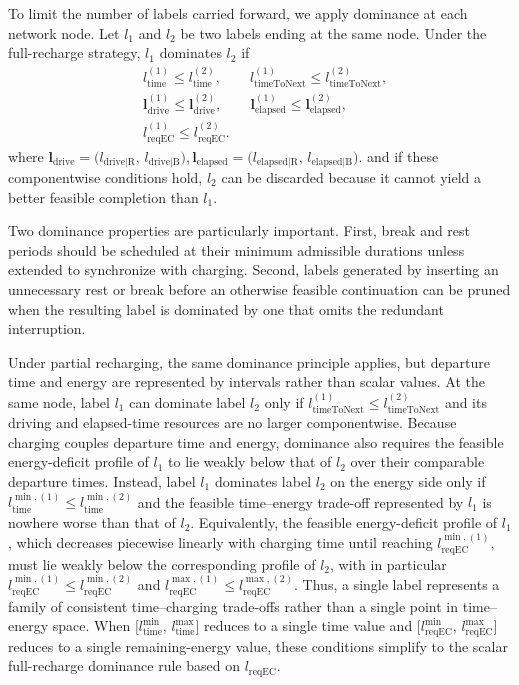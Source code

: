 \documentclass[3p,11pt,authoryear]{elsarticle}  %
\begin{document}
To limit the number of labels carried forward, we apply dominance at each network node. Let \(l_1\) and \(l_2\) be two labels ending at the same node. Under the full-recharge strategy, \(l_1\) dominates \(l_2\) if
\[
\begin{aligned}
&l_{\text{time}}^{(1)} \le l_{\text{time}}^{(2)},\qquad
l_{\text{timeToNext}}^{(1)} \le l_{\text{timeToNext}}^{(2)},\\
&\mathbf{l}_{\text{drive}}^{(1)} \le \mathbf{l}_{\text{drive}}^{(2)},\qquad
\mathbf{l}_{\text{elapsed}}^{(1)} \le \mathbf{l}_{\text{elapsed}}^{(2)},\\
&l_{\text{reqEC}}^{(1)} \le l_{\text{reqEC}}^{(2)}.
\end{aligned}
\]
where 
\(
\mathbf{l}_{\text{drive}}
=
\bigl(l_{\text{drive|R}},\,l_{\text{drive|B}}\bigr),
\mathbf{l}_{\text{elapsed}}
=
\bigl(l_{\text{elapsed|R}},\,l_{\text{elapsed|B}}\bigr).
\) and if these componentwise conditions hold, \(l_2\) can be discarded because it cannot yield a better feasible completion than \(l_1\).

Two dominance properties are particularly important. First, break and rest periods should be scheduled at their minimum admissible durations unless extended to synchronize with charging. Second, labels generated by inserting an unnecessary rest or break before an otherwise feasible continuation can be pruned when the resulting label is dominated by one that omits the redundant interruption. 

Under partial recharging, the same dominance principle applies, but departure time and energy are represented by intervals rather than scalar values. At the same node, label \(l_1\) can dominate label \(l_2\) only if \(l_{\text{timeToNext}}^{(1)} \le l_{\text{timeToNext}}^{(2)}\) and its driving and elapsed-time resources are no larger componentwise. Because charging couples departure time and energy, dominance also requires the feasible energy-deficit profile of \(l_1\) to lie weakly below that of \(l_2\) over their comparable departure times. Instead, label \(l_1\) dominates label \(l_2\) on the energy side only if \(l_{\text{time}}^{\min,(1)} \le l_{\text{time}}^{\min,(2)}\) and the feasible time--energy trade-off represented by \(l_1\) is nowhere worse than that of \(l_2\). Equivalently, the feasible energy-deficit profile of \(l_1\), which decreases piecewise linearly with charging time until reaching \(l_{\text{reqEC}}^{\min,(1)}\), must lie weakly below the corresponding profile of \(l_2\), with in particular \(l_{\text{reqEC}}^{\min,(1)} \le l_{\text{reqEC}}^{\min,(2)}\) and \(l_{\text{reqEC}}^{\max,(1)} \le l_{\text{reqEC}}^{\max,(2)}\). Thus, a single label represents a family of consistent time--charging trade-offs rather than a single point in time--energy space. When \(\bigl[l_{\text{time}}^{\min},\, l_{\text{time}}^{\max}\bigr]\) reduces to a single time value and \(\bigl[l_{\text{reqEC}}^{\min},\, l_{\text{reqEC}}^{\max}\bigr]\) reduces to a single remaining-energy value, these conditions simplify to the scalar full-recharge dominance rule based on \(l_{\text{reqEC}}\).
\end{document}
